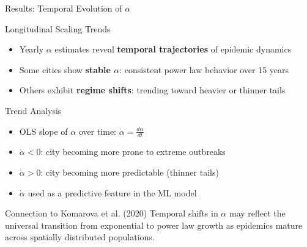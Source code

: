 \documentclass[10pt,aspectratio=169]{beamer}
\begin{document}
\begin{frame}{Results: Temporal Evolution of $\alpha$}
\begin{block}{Longitudinal Scaling Trends}
\begin{itemize}
    \item Yearly $\alpha$ estimates reveal \textbf{temporal trajectories} of epidemic dynamics
    \item Some cities show \textbf{stable $\alpha$}: consistent power law behavior over 15 years
    \item Others exhibit \textbf{regime shifts}: trending toward heavier or thinner tails
\end{itemize}
\end{block}

\vspace{0.3cm}

\begin{block}{Trend Analysis}
\begin{itemize}
    \item OLS slope of $\alpha$ over time: $\dot{\alpha} = \frac{d\alpha}{dt}$
    \item $\dot{\alpha} < 0$: city becoming more prone to extreme outbreaks
    \item $\dot{\alpha} > 0$: city becoming more predictable (thinner tails)
    \item $\dot{\alpha}$ used as a predictive feature in the ML model
\end{itemize}
\end{block}

\begin{exampleblock}{Connection to Komarova et al. (2020)}
Temporal shifts in $\alpha$ may reflect the universal transition from exponential to power law growth as epidemics mature across spatially distributed populations.
\end{exampleblock}
\end{frame}
\end{document}
